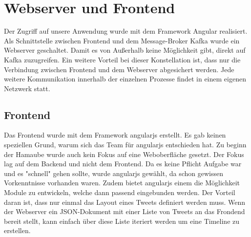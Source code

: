 \section{Webserver und Frontend}
Der Zugriff auf unsere Anwendung wurde mit dem Framework Angular realisiert. Als Schnittstelle zwischen Frontend und dem Message-Broker Kafka wurde ein Webserver geschaltet. Damit es von Außerhalb keine Möglichkeit gibt, direkt auf Kafka zuzugreifen. Ein weitere Vorteil bei dieser Konstellation ist, dass nur die Verbindung zwischen Frontend und dem Webserver abgesichert werden. Jede weitere Kommunikation innerhalb der einzelnen Prozesse findet in einem eigenen Netzwerk statt.

\subsection{Frontend}
Das Frontend wurde mit dem Framework angularjs erstellt. Es gab keinen speziellen Grund, warum sich das Team für angularjs entschieden hat. Zu beginn der Hamaube wurde auch kein Fokus auf eine Weboberfläche gesetzt. Der Fokus lag auf dem Backend und nicht dem Frontend. Da es keine Pflicht Aufgabe war und es "schnell" gehen sollte, wurde angularjs gewählt, da schon gewissen Vorkenntnisse vorhanden waren. Zudem bietet angularjs einem die Möglichkeit Module zu entwickeln, welche dann passend eingebunden werden. Der Vorteil daran ist, dass nur einmal das Layout eines Tweets definiert werden muss. Wenn der Webserver ein JSON-Dokument mit einer Liste von Tweets an das Frondend bereit stellt, kann einfach über diese Liste iteriert werden um eine Timeline zu erstellen. \\



	
	
	
